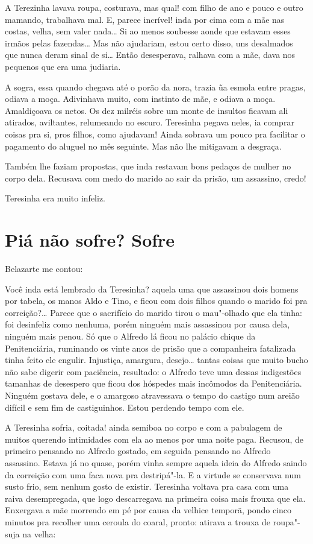 A Terezinha lavava roupa, costurava, mas qual! com filho de ano e pouco
e outro mamando, trabalhava mal. E, parece incrível! inda por cima com a
mãe nas costas, velha, sem valer nada\ldots{} Si ao menos soubesse aonde que
estavam esses irmãos pelas fazendas\ldots{} Mas não ajudariam, estou certo
disso, uns desalmados que nunca deram sinal de si\ldots{} Então desesperava,
ralhava com a mãe, dava nos pequenos que era uma judiaria.

A sogra, essa quando chegava até o porão da nora, trazia ũa esmola entre
pragas, odiava a moça. Adivinhava muito, com instinto de mãe, e odiava a
moça. Amaldiçoava os netos. Os dez milréis sobre um monte de insultos
ficavam ali atirados, aviltantes, relumeando no escuro. Teresinha pegava
neles, ia comprar coisas pra si, pros filhos, como ajudavam! Ainda
sobrava um pouco pra facilitar o pagamento do aluguel no mês seguinte.
Mas não lhe mitigavam a desgraça.

Também lhe faziam propostas, que inda restavam bons pedaços de mulher no
corpo dela. Recusava com medo do marido ao sair da prisão, um assassino,
credo!

Teresinha era muito infeliz.

\chapter{Piá não sofre? Sofre}

Belazarte me contou:

Você inda está lembrado da Teresinha? aquela uma que assassinou dois
homens por tabela, os manos Aldo e Tino, e ficou com dois filhos quando
o marido foi pra correição?\ldots{} Parece que o sacrifício do marido tirou o
mau"-olhado que ela tinha: foi desinfeliz como nenhuma, porém ninguém
mais assassinou por causa dela, ninguém mais penou. Só que o Alfredo lá
ficou no palácio chique da Penitenciária, ruminando os vinte anos de
prisão que a companheira fatalizada tinha feito ele engulir. Injustiça,
amargura, desejo\ldots{} tantas coisas que muito bucho não sabe digerir com
paciência, resultado: o Alfredo teve uma dessas indigestões tamanhas de
desespero que ficou dos hóspedes mais incômodos da Penitenciária.
Ninguém gostava dele, e o amargoso atravessava o tempo do castigo num
areião difícil e sem fim de castiguinhos. Estou perdendo tempo com ele.

A Teresinha sofria, coitada! ainda semiboa no corpo e com a pabulagem de
muitos querendo intimidades com ela ao menos por uma noite paga.
Recusou, de primeiro pensando no Alfredo gostado, em seguida pensando no
Alfredo assassino. Estava já no quase, porém vinha sempre aquela ideia
do Alfredo saindo da correição com uma faca nova pra destripá"-la. E a
virtude se conservava num susto frio, sem nenhum gosto de existir.
Teresinha voltava pra casa com uma raiva desempregada, que logo
descarregava na primeira coisa mais frouxa que ela. Enxergava a mãe
morrendo em pé por causa da velhice temporã, pondo cinco minutos pra
recolher uma ceroula do coaral, pronto: atirava a trouxa de roupa"-suja
na velha:


